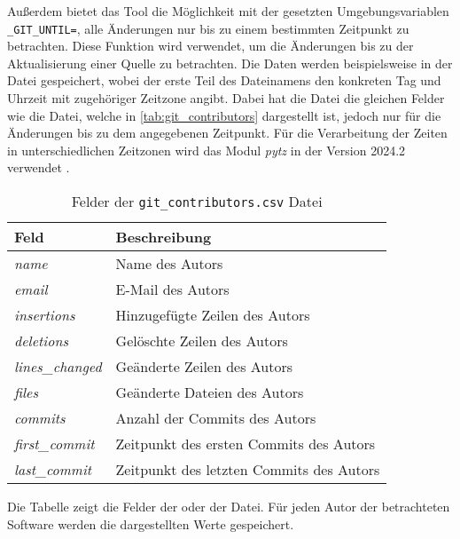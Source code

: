 Außerdem bietet das Tool die Möglichkeit mit der gesetzten Umgebungsvariablen \texttt{\_GIT\_UNTIL=}, alle Änderungen nur bis zu einem bestimmten Zeitpunkt zu betrachten.
Diese Funktion wird verwendet, um die Änderungen bis zu der Aktualisierung einer Quelle zu betrachten.
Die Daten werden beispielsweise in der Datei  gespeichert, wobei der erste Teil des Dateinamens den konkreten Tag und Uhrzeit mit zugehöriger Zeitzone angibt.
Dabei hat die Datei die gleichen Felder wie die  Datei, welche in \autoref{tab:git_contributors} dargestellt ist, jedoch nur für die Änderungen bis zu dem angegebenen Zeitpunkt.
Für die Verarbeitung der Zeiten in unterschiedlichen Zeitzonen wird das Modul \emph{pytz} in der Version 2024.2 verwendet \autocite{bishop_stub42pytz_2024}.

\begin{table}
    \centering
    \setlength{\tabcolsep}{8pt}
    \begin{tabular}{p{3.5cm}|p{10cm}}
        \toprule
        \textbf{Feld} & \textbf{Beschreibung} \\ \midrule
        \emph{name} & Name des Autors \\
        \emph{email} & E-Mail des Autors \\
        \emph{insertions} & Hinzugefügte Zeilen des Autors \\
        \emph{deletions} & Gelöschte Zeilen des Autors \\
        \emph{lines\_changed} & Geänderte Zeilen des Autors \\
        \emph{files} & Geänderte Dateien des Autors \\
        \emph{commits} & Anzahl der Commits des Autors \\
        \emph{first\_commit} & Zeitpunkt des ersten Commits des Autors \\
        \emph{last\_commit} & Zeitpunkt des letzten Commits des Autors \\
        \bottomrule
    \end{tabular}
    \caption{Felder der \texttt{git\_contributors.csv} Datei}
    \label{tab:git_contributors}
    \small
    Die Tabelle zeigt die Felder der  oder der  Datei. Für jeden Autor der betrachteten Software werden die dargestellten Werte gespeichert.
\end{table}
